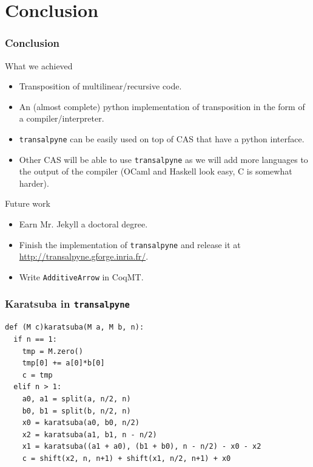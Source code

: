 \documentclass[10pt]{beamer}
\newcommand{\tALpy}{\texttt{transalpyne}}
\begin{document}


\section{Conclusion}

\begin{frame}
  \frametitle{Conclusion}
  
  \begin{block}{What we achieved}
    \begin{itemize}
    \item Transposition of multilinear/recursive code.
    \item An (almost complete) python implementation of transposition
      in the form of a compiler/interpreter.
    \item \tALpy{} can be easily used on top of CAS that have a python
      interface.
    \item Other CAS will be able to use \tALpy{} as we will add more
      languages to the output of the compiler (OCaml and Haskell look
      easy, C is somewhat harder).
    \end{itemize}
  \end{block}

  \begin{block}{Future work}
    \begin{itemize}
    \item Earn Mr. Jekyll a doctoral degree.
    \item Finish the implementation of \tALpy{} and release it at
      \url{http://transalpyne.gforge.inria.fr/}.
    \item Write \lstinline{AdditiveArrow} in CoqMT.
    \end{itemize}
  \end{block}
\end{frame}


\lstset{language=python}

\begin{frame}[fragile]
  \frametitle{Karatsuba in \tALpy}

\begin{lstlisting}
def (M c)karatsuba(M a, M b, n):
  if n == 1:
    tmp = M.zero()
    tmp[0] += a[0]*b[0]
    c = tmp
  elif n > 1:
    a0, a1 = split(a, n/2, n)
    b0, b1 = split(b, n/2, n)
    x0 = karatsuba(a0, b0, n/2)
    x2 = karatsuba(a1, b1, n - n/2)
    x1 = karatsuba((a1 + a0), (b1 + b0), n - n/2) - x0 - x2
    c = shift(x2, n, n+1) + shift(x1, n/2, n+1) + x0
\end{lstlisting}
\end{frame}
\end{document}
